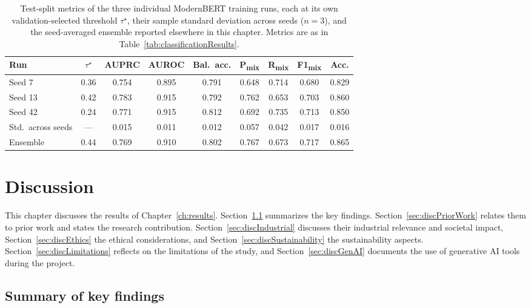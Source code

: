 \documentclass[english, bibtex]{kththesis}               %
\numberwithin{listing}{chapter}
\begin{document}
\begin{table}[!ht]
\centering
\small
\setlength{\tabcolsep}{3pt}
\renewcommand{\arraystretch}{1.1}
\caption[Test-split metrics of the three individual ModernBERT training runs and the ensemble]{Test-split metrics of the three individual ModernBERT training runs, each at its own validation-selected threshold $\tau^\star$, their sample standard deviation across seeds ($n = 3$), and the seed-averaged ensemble reported elsewhere in this chapter. Metrics are as in Table~\ref{tab:classificationResults}.}
\label{tab:seedStability}
\begin{tabular}{l|c|ccccccc}
\textbf{Run} & $\tau^\star$ & \textbf{AUPRC} & \textbf{AUROC} & \textbf{Bal.\ acc.} & \textbf{P\textsubscript{mix}} & \textbf{R\textsubscript{mix}} & \textbf{F1\textsubscript{mix}} & \textbf{Acc.} \\
\hline
Seed 7  & 0.36 & 0.754 & 0.895 & 0.791 & 0.648 & 0.714 & 0.680 & 0.829 \\
Seed 13 & 0.42 & 0.783 & 0.915 & 0.792 & 0.762 & 0.653 & 0.703 & 0.860 \\
Seed 42 & 0.24 & 0.771 & 0.915 & 0.812 & 0.692 & 0.735 & 0.713 & 0.850 \\
\hline
Std.\ across seeds & --- & 0.015 & 0.011 & 0.012 & 0.057 & 0.042 & 0.017 & 0.016 \\
\hline
Ensemble & 0.44 & 0.769 & 0.910 & 0.802 & 0.767 & 0.673 & 0.717 & 0.865 \\
\end{tabular}
\end{table}

\cleardoublepage
\chapter{Discussion}
\label{ch:discussion}

This chapter discusses the results of Chapter~\ref{ch:results}. Section~\ref{sec:discKeyFindings} summarizes the key findings. Section~\ref{sec:discPriorWork} relates them to prior work and states the research contribution. Section~\ref{sec:discIndustrial} discusses their industrial relevance and societal impact, Section~\ref{sec:discEthics} the ethical considerations, and Section~\ref{sec:discSustainability} the sustainability aspects. Section~\ref{sec:discLimitations} reflects on the limitations of the study, and Section~\ref{sec:discGenAI} documents the use of generative AI tools during the project.

\section{Summary of key findings}
\label{sec:discKeyFindings}
\end{document}
